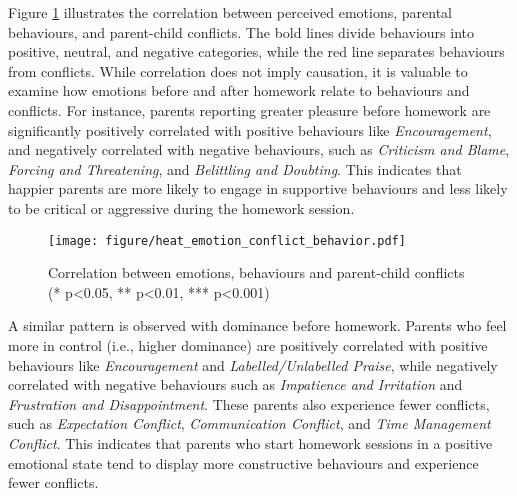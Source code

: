 Figure \ref{fig:heatmap:emotion_conflict_behaviours} illustrates the correlation between perceived emotions, parental behaviours, and parent-child conflicts. The bold lines divide behaviours into positive, neutral, and negative categories, while the red line separates behaviours from conflicts.  While correlation does not imply causation, it is valuable to examine how emotions before and after homework relate to behaviours and conflicts. For instance, parents reporting greater pleasure before homework are significantly positively correlated with positive behaviours like \textit{Encouragement}, and negatively correlated with negative behaviours, such as \textit{Criticism and Blame}, \textit{Forcing and Threatening}, and \textit{Belittling and Doubting}. This indicates that happier parents are more likely to engage in supportive behaviours and less likely to be critical or aggressive during the homework session.


\begin{figure}
    \centering
    \texttt{[image: figure/heat\_emotion\_conflict\_behavior.pdf]}
    \caption{Correlation between emotions, behaviours and parent-child conflicts (* p<0.05, ** p<0.01, *** p<0.001)}
    \label{fig:heatmap:emotion_conflict_behaviours}
\end{figure}

A similar pattern is observed with dominance before homework. Parents who feel more in control (i.e., higher dominance) are positively correlated with positive behaviours like \textit{Encouragement} and \textit{Labelled/Unlabelled Praise}, while negatively correlated with negative behaviours such as \textit{Impatience and Irritation} and \textit{Frustration and Disappointment}. These parents also experience fewer conflicts, such as \textit{Expectation Conflict}, \textit{Communication Conflict}, and \textit{Time Management Conflict}. This indicates that parents who start homework sessions in a positive emotional state tend to display more constructive behaviours and experience fewer conflicts.

